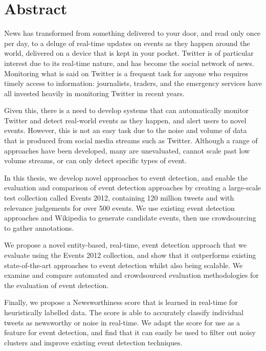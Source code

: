 
\chapter*{Abstract}
\thispagestyle{empty}
\vspace{-1cm}
News has transformed from something delivered to your door, and read only once per day, to a deluge of real-time updates on events as they happen around the world, delivered on a device that is kept in your pocket.
Twitter is of particular interest due to its real-time nature, and has become the social network of news. Monitoring what is said on Twitter is a frequent task for anyone who requires timely access to information: journalists, traders, and the emergency services have all invested heavily in monitoring Twitter in recent years.

Given this, there is a need to develop systems that can automatically monitor Twitter and detect real-world events as they happen, and alert users to novel events. However, this is not an easy task due to the noise and volume of data that is produced from social media streams such as Twitter. Although a range of approaches have been developed, many are unevaluated, cannot scale past low volume streams, or can only detect specific types of event.

In this thesis, we develop novel approaches to event detection, and enable the evaluation and comparison of event detection approaches by creating a large-scale test collection called Events 2012, containing 120 million tweets and with relevance judgements for over 500 events. We use existing event detection approaches and Wikipedia to generate candidate events, then use crowdsourcing to gather annotations.

We propose a novel entity-based, real-time, event detection approach that we evaluate using the Events 2012 collection, and show that it outperforms existing state-of-the-art approaches to event detection whilst also being scalable.
We examine and compare automated and crowdsourced evaluation methodologies for the evaluation of event detection.

Finally, we propose a Newsworthiness score that is learned in real-time for heuristically labelled data. The score is able to accurately classify individual tweets as newsworthy or noise in real-time. We adapt the score for use as a feature for event detection, and find that it can easily be used to filter out noisy clusters and improve existing event detection techniques.